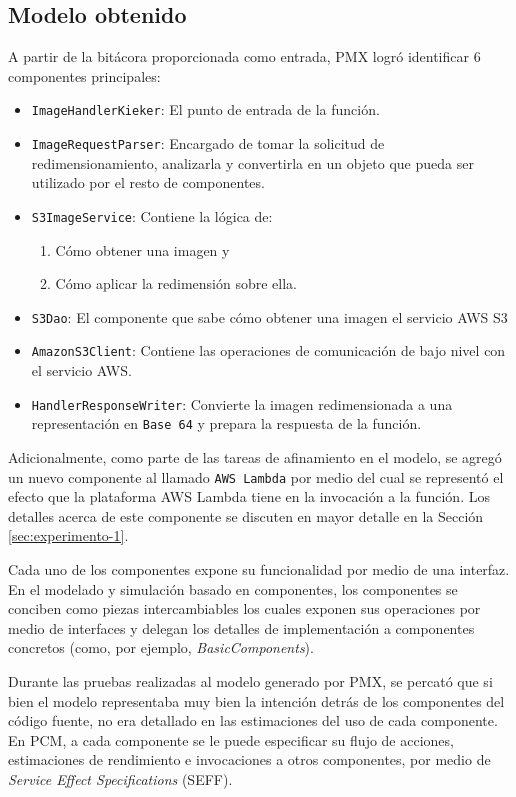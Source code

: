 \newpage
\subsection{Modelo obtenido}
A partir de la bitácora proporcionada como entrada, PMX logró identificar 6 componentes principales:
\begin{itemize} 
    \item \texttt{ImageHandlerKieker}: El punto de entrada de la función.
    \item \texttt{ImageRequestParser}: Encargado de tomar la solicitud de redimensionamiento, analizarla y convertirla en un objeto que pueda ser utilizado por el resto de componentes.
    \item \texttt{S3ImageService}: Contiene la lógica de:
        \begin{enumerate}
            \item Cómo obtener una imagen y
            \item Cómo aplicar la redimensión sobre ella.
        \end{enumerate}
    \item \texttt{S3Dao}: El componente que sabe cómo obtener una imagen el servicio AWS S3
    \item \texttt{AmazonS3Client}: Contiene las operaciones de comunicación de bajo nivel con el servicio AWS.
    \item \texttt{HandlerResponseWriter}: Convierte la imagen redimensionada a una representación en \texttt{Base 64} y prepara la respuesta de la función.
\end{itemize}

Adicionalmente, como parte de las tareas de afinamiento en el modelo, se agregó un nuevo componente al llamado \texttt{AWS Lambda} por medio del cual se representó el efecto que la plataforma AWS Lambda tiene en la invocación a la función. Los detalles acerca de este componente se discuten en mayor detalle en la Sección \ref{sec:experimento-1}. 

Cada uno de los componentes expone su funcionalidad por medio de una interfaz. En el modelado y simulación basado en componentes, los componentes se conciben como piezas intercambiables los cuales exponen sus operaciones por medio de interfaces y delegan los detalles de implementación a componentes concretos (como, por ejemplo, \emph{BasicComponents}). 

Durante las pruebas realizadas al modelo generado por PMX, se percató que si bien el modelo representaba muy bien la intención detrás de los componentes del código fuente, no era detallado en las estimaciones del uso de cada componente. En PCM, a cada componente se le puede especificar su flujo de acciones, estimaciones de rendimiento e invocaciones a otros componentes, por medio de \emph{Service Effect Specifications} (SEFF). 

